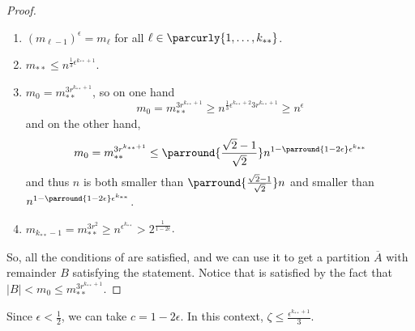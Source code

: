 \begin{theorem}[Theorem 4.16]
\begin{proof}
\begin{enumerate}
                \item $(m_{\ell-1})^\epsilon = m_\ell$ for all $\ell \in \parcurly{1, \dots, k_{**}}$.
                \item $m_{**} \leq n^{\frac{1}{3}\epsilon^{k_{**}+1}}$.
                \item $m_0 = m_{**}^{3r^{k_{**}+1}}$, so on one hand
                    \[
                        m_0 = m_{**}^{3r^{k_{**}+1}} \geq n^{\frac{1}{3}\epsilon^{k_{**}+2} 3r^{k_{**}+1}}
                            \geq n^{\epsilon}
                    \]
                    and on the other hand,
                    \[
                        m_0 = m_{**}^{3r^{k_{**}+1}} \leq \parround{\frac{\sqrt{2}-1}{\sqrt{2}}} n^{1 - \parround{1 - 2\epsilon} \epsilon^{k_{**}}}
                    \]
                    and thus $n$ is both smaller than $\parround{\frac{\sqrt{2}-1}{\sqrt{2}}} n$ and
                    smaller than $n^{1 - \parround{1 - 2\epsilon} \epsilon^{k_{**}}}$.
                \item $m_{k_{**}-1} = m_{**}^{3r^2} \geq n^{\epsilon^{k_{**}}} > 2^{\frac{1}{1-2\epsilon}}$.
            \end{enumerate}
            So, all the conditions of  are satisfied,
            and we can use it to get a partition $\overline{A}$ with remainder $B$ satisfying the statement.
            Notice that 
            is satisfied by the fact that $|B| < m_0 \leq m_{**}^{3r^{k_{**}+1}}$.
        \end{proof}
    \end{theorem}


    \begin{remark} \label{rmk:subpair_bound_specification}
        Since $\epsilon < \frac{1}{2}$, we can take $c = 1 - 2\epsilon$.
        In this context, $\zeta \leq \frac{\epsilon^{k_{**}+1}}{3}$.
    \end{remark} 


    \begin{thebibliography}{99}

        \printbibliography[heading=none]

    \end{thebibliography}

